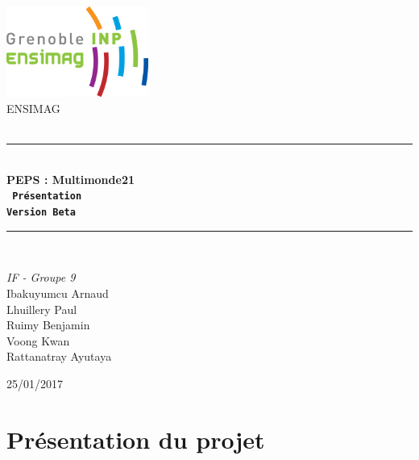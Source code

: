 \documentclass[a4paper,12pt]{article}
\newcommand{\HRule}{\rule{\linewidth}{0.5mm}} %
\begin{document}
\begin{titlepage}
\begin{center}

\includegraphics[width=0.35\textwidth]{logo}~\\[2.5cm] %

\textsc{\LARGE ENSIMAG}\\[1.5cm]
\textsc{\Large }\\[0.5cm]

\HRule \\[0.4cm]

{\Huge \bfseries \textsf{PEPS : Multimonde21}\\[0.5cm]
\texttt{ Présentation\\
Version Beta} \\[0.4cm] }

\HRule \\[1.5cm]

\begin{minipage}{0.4\textwidth}
\begin{center} \large
\emph{IF - Groupe 9}\\[2cm]
Ibakuyumcu Arnaud \\
Lhuillery Paul \\
Ruimy Benjamin \\
Voong Kwan \\
Rattanatray Ayutaya
\end{center}
\end{minipage}
\begin{minipage}{0.4\textwidth}
\end{minipage}

\vfill

\large {25/01/2017 }

\end{center}

\end{titlepage}
 \newpage


 \tableofcontents %
 \newpage

 \part{Présentation du projet}
\end{document}
